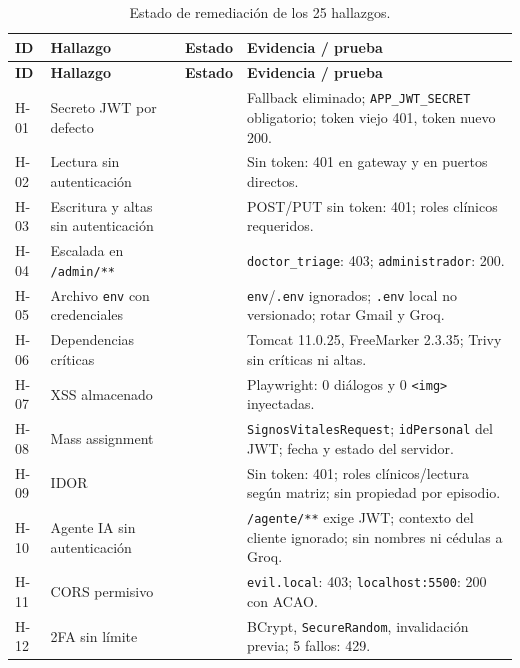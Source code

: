 {\small
\setlength{\tabcolsep}{3pt}
\begin{longtable}{@{}L{1.0cm}L{5.2cm}L{2.2cm}L{7.0cm}@{}}
\caption{Estado de remediación de los 25 hallazgos.}
\label{tab:estado-hallazgos}\\
\toprule
\textbf{ID} & \textbf{Hallazgo} & \textbf{Estado} & \textbf{Evidencia / prueba}\\
\midrule
\endfirsthead
\toprule
\textbf{ID} & \textbf{Hallazgo} & \textbf{Estado} & \textbf{Evidencia / prueba}\\
\midrule
\endhead
\bottomrule
\endlastfoot
H-01 & Secreto JWT por defecto &  & Fallback eliminado; \texttt{APP\_JWT\_SECRET} obligatorio; token viejo 401, token nuevo 200.\\
H-02 & Lectura sin autenticación &  & Sin token: 401 en gateway y en puertos directos.\\
H-03 & Escritura y altas sin autenticación &  & POST/PUT sin token: 401; roles clínicos requeridos.\\
H-04 & Escalada en \texttt{/admin/**} &  & \texttt{doctor\_triage}: 403; \texttt{administrador}: 200.\\
H-05 & Archivo \texttt{env} con credenciales &  & \texttt{env}/\texttt{.env} ignorados; \texttt{.env} local no versionado; rotar Gmail y Groq.\\
H-06 & Dependencias críticas &  & Tomcat 11.0.25, FreeMarker 2.3.35; Trivy sin críticas ni altas.\\
H-07 & XSS almacenado &  & Playwright: 0 diálogos y 0 \texttt{<img>} inyectadas.\\
H-08 & Mass assignment &  & \texttt{SignosVitalesRequest}; \texttt{idPersonal} del JWT; fecha y estado del servidor.\\
H-09 & IDOR &  & Sin token: 401; roles clínicos/lectura según matriz; sin propiedad por episodio.\\
H-10 & Agente IA sin autenticación &  & \texttt{/agente/**} exige JWT; contexto del cliente ignorado; sin nombres ni cédulas a Groq.\\
H-11 & CORS permisivo &  & \texttt{evil.local}: 403; \texttt{localhost:5500}: 200 con ACAO.\\
H-12 & 2FA sin límite &  & BCrypt, \texttt{SecureRandom}, invalidación previa; 5 fallos: 429.\\

\end{longtable}}
